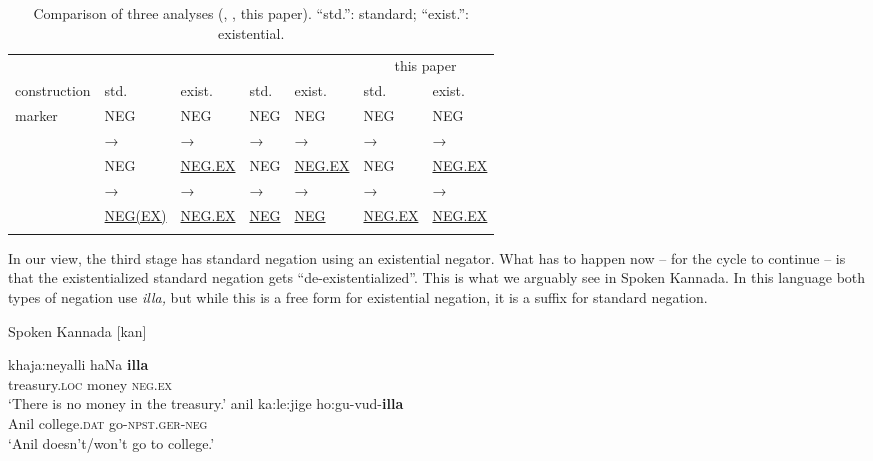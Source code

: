 ﻿\documentclass[output=paper,draft,draftmode,colorlinks,citecolor=brown]{langscibook}
\begin{document}
\begin{table}
\begin{tabularx}{\textwidth}{l l l l l l l}
\lsptoprule
&\multicolumn{2}{c}{\cite{Croft1991}}&\multicolumn{2}{c}{\cite{Veselinova2014}}&\multicolumn{2}{c}{this
paper}\\\cmidrule(lr){2-3}\cmidrule(lr){4-5}\cmidrule(lr){6-7}
construction & std. & exist. & std. & exist. & std. & exist. \\\midrule
marker  &NEG        &NEG        &NEG        &NEG        &NEG        &NEG\\
        &→          &→          &→          &→          &→          &→\\
        &NEG        &\uline{NEG.EX}     &NEG        &\uline{NEG.EX}
        &NEG &\uline{NEG.EX}\\
        &→          &→          &→          &→          &→          &→\\
        &\uline{NEG(EX)}    &\uline{NEG.EX}     &\uline{NEG}
        &\uline{NEG}     &\uline{NEG.EX} &\uline{NEG.EX}\\
\lspbottomrule
\end{tabularx}
\caption{Comparison of three analyses (\citealt{Croft1991}, \citealt{Veselinova2014}, this paper). “std.”: standard; “exist.”: existential.\label{tab:int-three-analyses}}
\end{table}
%
In our view, the third stage has standard negation using an existential
negator. What has to happen now -- for the cycle to continue -- is that the
existentialized standard negation gets ``de-existentialized''. This is what
we arguably see in Spoken Kannada. In this language both types of negation
use \textit{illa,} but while this is a free form for existential negation,
it is a suffix for standard negation.
%
\begin{exe}\ex\label{ex:int-kannada-money-college}
           Spoken Kannada [kan] 
    \begin{xlist}
    \ex\label{ex:int-kannada-money}
    \gll khaja:neyalli    haNa    \textbf{illa} \\
    treasury.\textsc{loc}    money  \textsc{neg.ex} \\
    \glt `There is no money in the treasury.'
    \ex\label{ex:int-kannada-college}
    \gll anil  ka:le:jige  ho:gu-vud-\textbf{illa}\\
    Anil  college.\textsc{dat}  go-\textsc{npst.ger-neg}\\
    \glt `Anil doesn't/won't go to college.'
    \end{xlist}\end{exe}
\end{document}

